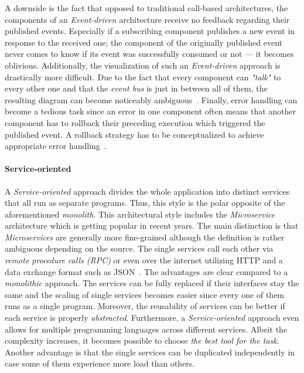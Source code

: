 \documentclass[12pt,a4paper]{report}
\begin{document}
A downside is the fact that opposed to traditional call-based architectures,
the components of an \textit{Event-driven} architecture receive no feedback regarding
their published events. Especially if a subscribing component publishes a new event
in response to the received one; the component of the originally published
event never comes to know if its event was successfully consumed or not ---
it becomes oblivious.
Additionally, the visualization of such an \textit{Event-driven} approach
is drastically more difficult. Due to the fact that every component can
\textit{"talk"} to every other one and that the \textit{event bus} is just in between
all of them, the resulting diagram can become noticeably ambiguous~\cite{fairbanks-sa}.
Finally, error handling can become a tedious task since an error in one component
often means that another component has to rollback their preceding execution which
triggered the published event. A rollback strategy has to be conceptualized to
achieve appropriate error handling~\cite{richards-sa-patterns}.

\paragraph{Service-oriented}
A \textit{Service-oriented} approach divides the whole application into distinct
services that all run as separate programs. Thus, this style is the
polar opposite of the aforementioned \textit{monolith}.
This architectural style includes the \textit{Microservice} architecture
which is getting popular in recent years. The main distinction is that
\textit{Microservices} are generally more fine-grained although the definition
is rather ambiguous depending on the source.
The single services call each other via
\textit{remote procedure calls (RPC)} or even over the internet utilizing HTTP
and a data exchange format such as JSON~\cn.
The advantages are clear compared to a \textit{monolithic} approach.
The services can be fully replaced if their interfaces stay the same and the
scaling of single services becomes easier since every one of them runs as a single program.
Moreover, the reusability of services can be better if each service is properly \textit{abstracted}.
Furthermore, a \textit{Service-oriented} approach even allows for multiple programming languages
across different services. Albeit the complexity increases, it becomes possible
to choose \textit{the best tool for the task}.
Another advantage is that the single services can be duplicated independently
in case some of them experience more load than others.
\end{document}
